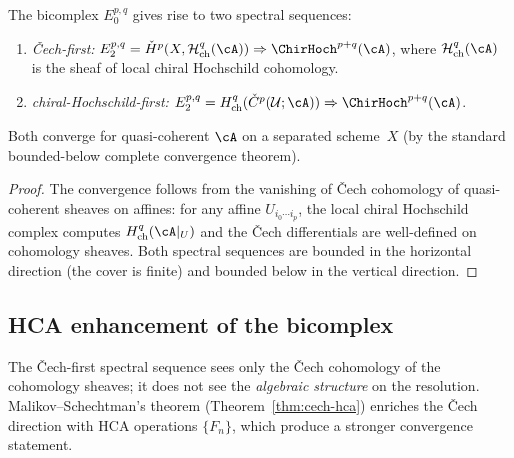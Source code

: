 \begin{proposition}
\label{prop:hochschild-cech-ss}
The bicomplex $E_0^{p,q}$ gives rise to two spectral sequences:
\begin{enumerate}[label=\textup{(\roman*)}]
\item \emph{\v{C}ech-first:} $E_2^{p,q} =
 \check{H}^p(X, \mathcal{H}^q_{\mathrm{ch}}(\cA))
 \Rightarrow \ChirHoch^{p+q}(\cA)$,
 where $\mathcal{H}^q_{\mathrm{ch}}(\cA)$ is the sheaf of
 local chiral Hochschild cohomology.
\item \emph{chiral-Hochschild-first:} $E_2^{p,q} =
 H^q_{\mathrm{ch}}(\check{C}^p(\mathcal{U};\cA))
 \Rightarrow \ChirHoch^{p+q}(\cA)$.
\end{enumerate}
Both converge for quasi-coherent $\cA$ on a separated scheme~$X$
(by the standard bounded-below complete convergence theorem).
\end{proposition}

\begin{proof}
The convergence follows from the vanishing of \v{C}ech cohomology
of quasi-coherent sheaves on affines: for any affine
$U_{i_0\cdots i_p}$, the local chiral Hochschild complex computes
$H^q_{\mathrm{ch}}(\cA|_U)$ and the \v{C}ech differentials are
well-defined on cohomology sheaves. Both spectral sequences are
bounded in the horizontal direction (the cover is finite) and
bounded below in the vertical direction.
\end{proof}

\subsection{HCA enhancement of the bicomplex}
\label{subsec:hca-hochschild}

The \v{C}ech-first spectral sequence sees only the \v{C}ech
cohomology of the cohomology sheaves; it does not see the
\emph{algebraic structure} on the resolution.
Malikov--Schechtman's theorem
(Theorem~\ref{thm:cech-hca}) enriches the \v{C}ech direction
with HCA operations $\{F_n\}$, which produce a stronger
convergence statement.

